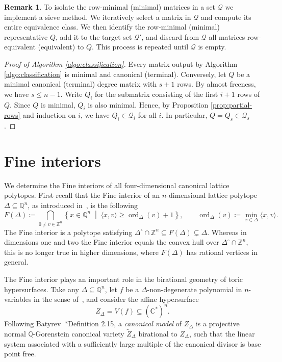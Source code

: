\documentclass{amsart}
\newcommand{\C}{\mathbb{C}}
\newcommand{\Q}{\mathbb{Q}}
\newcommand{\Z}{\mathbb{Z}}
\DeclareMathOperator{\ord}{ord}
\theoremstyle{plain}
\theoremstyle{definition}
\newtheorem{remark}[theorem]{Remark}
\begin{document}
\begin{remark}
To isolate the row-minimal (minimal) matrices in a set $\mathcal{Q}$ we
implement a sieve method.
We iteratively select a matrix in $\mathcal{Q}$ and compute its entire
equivalence class.
We then identify the row-minimal (minimal) representative $Q$, add it
to the target set $\mathcal{Q'}$, and discard from $\mathcal{Q}$ all
matrices row-equivalent (equivalent) to $Q$.
This process is repeated until $\mathcal{Q}$ is empty.
\end{remark}

\begin{proof}[Proof of Algorithm \ref{algo:classification}]
Every matrix output by Algorithm \ref{algo:classification} is minimal
and canonical (terminal).
Conversely, let $Q$ be a minimal canonical (terminal) degree matrix
with $s+1$ rows.
By almost freeness, we have $s \le n-1$. Write $Q_i$ for the submatrix
consisting of the first $i+1$ rows of $Q$. Since $Q$ is minimal, $Q_i$ is also minimal. Hence, by Proposition \ref{prop:partial-rows} and induction on $i$,
we have $Q_i\in\mathcal{Q}_i$ for all $i$. In particular,
$Q = Q_s \in \mathcal{Q}_s$. 
\end{proof}
\section{Fine interiors}\label{sec:fine}

We determine the Fine interiors of all four-dimensional
canonical lattice polytopes.
First recall that the Fine interior of an $n$-dimensional
lattice polytope $\Delta \subseteq \Q^n$, as introduced
in~\cite{Fin}, is the following  
$$
F(\Delta)\coloneqq
\bigcap_{0\neq v\in \Z^n}
\left\{
x \in \Q^n \;\middle|\; \langle x,v\rangle \geq \ord_\Delta(v)+1
\right\},
\qquad
\ord_\Delta(v)\coloneqq \min_{x\in \Delta}\langle x,v\rangle.
$$
The Fine interior is a polytope satisfying
$\Delta^\circ\cap \Z^n \subseteq F(\Delta) \subsetneq \Delta$.
Whereas in dimensions one and two the Fine interior equals
the convex hull over $\Delta^\circ\cap \Z^n$, this is no
longer true in higher dimensions, where $F(\Delta)$ has
rational vertices in general.

The Fine interior plays an important role in the birational
geometry of toric hypersurfaces.
Take any $\Delta \subseteq \Q^n$, let $f$ be a $\Delta$-non-degenerate
polynomial in $n$-variables in the sense of~\cite{Kho},
and consider the  affine hypersurface
$$
Z_\Delta = V(f) \subseteq (\C^*)^n.
$$
Following Batyrev~\cite{Bat17}*{Definition 2.15}, a \emph{canonical model}
of $Z_\Delta$ is a projective normal $\Q$-Gorenstein canonical variety
$\widetilde Z_\Delta$ birational to $Z_\Delta$, such that the
linear system associated with a sufficiently large multiple of
the canonical divisor is base point free.
\end{document}
